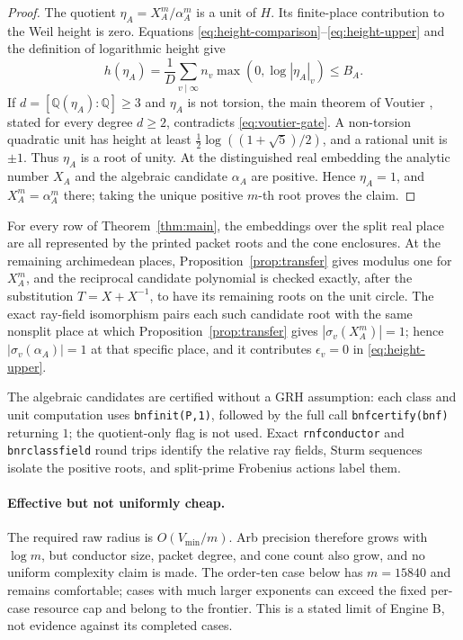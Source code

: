\documentclass[11pt]{article}
\newcommand{\Q}{\mathbb Q}
\begin{document}
\begin{proof}
The quotient
\(\eta_A=X_A^m/\alpha_A^m\) is a unit of \(H\).  Its finite-place
contribution to the Weil height is zero.
Equations \eqref{eq:height-comparison}--\eqref{eq:height-upper} and
the definition of logarithmic height give
\[
 h(\eta_A)
 =\frac1D\sum_{v\mid\infty}
 n_v\max(0,\log|\eta_A|_v)
 \le B_A.
\]
If \(d=[\Q(\eta_A):\Q]\ge3\) and \(\eta_A\) is not torsion,
the main theorem of Voutier \cite[p.~82]{Voutier1996}, stated for
every degree \(d\ge2\), contradicts \eqref{eq:voutier-gate}.  A
non-torsion quadratic unit has height at least
\(\frac12\log((1+\sqrt5)/2)\), and a rational unit is \(\pm1\).
Thus \(\eta_A\) is a root of unity.  At the distinguished real
embedding the analytic number \(X_A\) and the algebraic candidate
\(\alpha_A\) are positive.  Hence \(\eta_A=1\), and
\(X_A^m=\alpha_A^m\) there; taking the unique positive
\(m\)-th root proves the claim.
\end{proof}

For every row of Theorem~\ref{thm:main}, the embeddings over the
split real place are all represented by the printed packet roots and
the cone enclosures.  At the remaining archimedean places,
Proposition~\ref{prop:transfer} gives modulus one for \(X_A^m\), and
the reciprocal candidate polynomial is checked exactly, after the
substitution \(T=X+X^{-1}\), to have its remaining roots on the unit
circle.  The exact ray-field isomorphism pairs each such candidate
root with the same nonsplit place at which
Proposition~\ref{prop:transfer} gives
\(|\sigma_v(X_A^m)|=1\); hence
\(|\sigma_v(\alpha_A)|=1\) at that specific place, and it contributes
\(\epsilon_v=0\) in \eqref{eq:height-upper}.

The algebraic candidates are certified without a GRH assumption:
each class and unit computation uses \texttt{bnfinit(P,1)}, followed
by the full call \texttt{bnfcertify(bnf)} returning \(1\); the
quotient-only flag is not used.  Exact \texttt{rnfconductor} and
\texttt{bnrclassfield} round trips identify the relative ray fields,
Sturm sequences isolate the positive roots, and split-prime
Frobenius actions label them.

\paragraph{Effective but not uniformly cheap.}
The required raw radius is \(O(V_{\min}/m)\).  Arb precision therefore
grows with \(\log m\), but conductor size, packet degree, and cone
count also grow, and no uniform complexity claim is made.  The
order-ten case below has \(m=15840\) and remains comfortable; cases
with much larger exponents can exceed the fixed per-case resource cap
and belong to the frontier.  This is a stated limit of Engine B, not
evidence against its completed cases.
\end{document}
